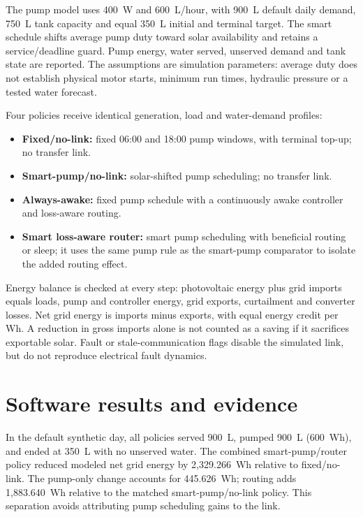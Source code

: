 \documentclass[11pt]{article}
\begin{document}
The pump model uses 400~W and 600~L/hour, with 900~L default daily demand, 750~L tank capacity and equal 350~L initial and terminal target. The smart schedule shifts average pump duty toward solar availability and retains a service/deadline guard. Pump energy, water served, unserved demand and tank state are reported. The assumptions are simulation parameters: average duty does not establish physical motor starts, minimum run times, hydraulic pressure or a tested water forecast.

Four policies receive identical generation, load and water-demand profiles:
\begin{itemize}
\item \textbf{Fixed/no-link:} fixed 06:00 and 18:00 pump windows, with terminal top-up; no transfer link.
\item \textbf{Smart-pump/no-link:} solar-shifted pump scheduling; no transfer link.
\item \textbf{Always-awake:} fixed pump schedule with a continuously awake controller and loss-aware routing.
\item \textbf{Smart loss-aware router:} smart pump scheduling with beneficial routing or sleep; it uses the same pump rule as the smart-pump comparator to isolate the added routing effect.
\end{itemize}

Energy balance is checked at every step: photovoltaic energy plus grid imports equals loads, pump and controller energy, grid exports, curtailment and converter losses. Net grid energy is imports minus exports, with equal energy credit per Wh. A reduction in gross imports alone is not counted as a saving if it sacrifices exportable solar. Fault or stale-communication flags disable the simulated link, but do not reproduce electrical fault dynamics.

\section{Software results and evidence}
In the default synthetic day, all policies served 900~L, pumped 900~L (600~Wh), and ended at 350~L with no unserved water. The combined smart-pump/router policy reduced modeled net grid energy by 2,329.266~Wh relative to fixed/no-link. The pump-only change accounts for 445.626~Wh; routing adds 1,883.640~Wh relative to the matched smart-pump/no-link policy. This separation avoids attributing pump scheduling gains to the link.
\end{document}
